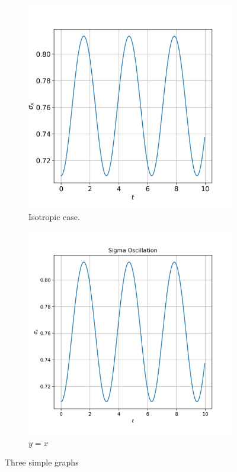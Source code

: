 \documentclass{article}
\begin{document}
\begin{figure}
    \centering
    \begin{subfigure}[b]{0.45\textwidth}
        \centering
        \includegraphics[width=\textwidth]{imgs/sigma_oscillations/sigma_oscillation_isotrop.jpeg}
        \caption{Isotropic case.}
        \label{fig:isotropic-oscillation}
    \end{subfigure}
    \hfill
    \begin{subfigure}[b]{0.45\textwidth}
        \centering
        \includegraphics[width=\textwidth]{imgs/sigma_oscillation.jpeg}
        \caption{$y=x$}
        \label{fig:y equals x}
    \end{subfigure}
    
    \caption{Three simple graphs}
    \label{fig:three graphs}
\end{figure}
\end{document}
